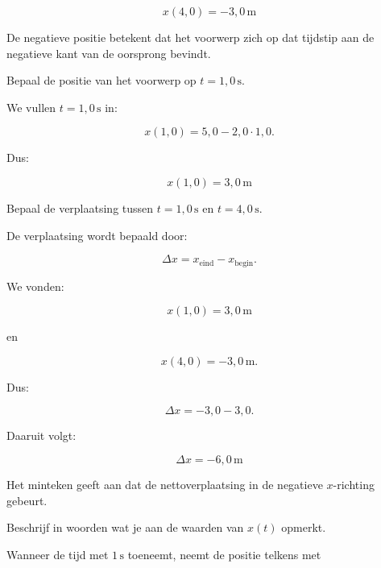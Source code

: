 \documentclass{ximera}
\begin{document}
\begin{oefening}{\oefB\ESS}
\begin{question}
\begin{oplossing}
  \[
  \boxed{x(4{,}0)=-3{,}0\,\mathrm{m}}
  \]
  
  De negatieve positie betekent dat het voorwerp zich op dat tijdstip aan de
  negatieve kant van de oorsprong bevindt.
  \end{oplossing}
  \end{question}
  
  
  \begin{question}
  Bepaal de positie van het voorwerp op $t=1{,}0\,\mathrm{s}$.
  
  \begin{oplossing}
  We vullen $t=1{,}0\,\mathrm{s}$ in:
  
  \[
  x(1{,}0)
  =
  5{,}0-2{,}0\cdot 1{,}0.
  \]
  
  Dus:
  
  \[
  \boxed{x(1{,}0)=3{,}0\,\mathrm{m}}
  \]
  \end{oplossing}
  \end{question}
  
  
  \begin{question}
  Bepaal de verplaatsing tussen $t=1{,}0\,\mathrm{s}$ en
  $t=4{,}0\,\mathrm{s}$.
  
  \begin{oplossing}
  De verplaatsing wordt bepaald door:
  
  \[
  \Delta x
  =
  x_{\text{eind}}
  -
  x_{\text{begin}}.
  \]
  
  We vonden:
  
  \[
  x(1{,}0)=3{,}0\,\mathrm{m}
  \]
  
  en
  
  \[
  x(4{,}0)=-3{,}0\,\mathrm{m}.
  \]
  
  Dus:
  
  \[
  \Delta x
  =
  -3{,}0-3{,}0.
  \]
  
  Daaruit volgt:
  
  \[
  \boxed{\Delta x=-6{,}0\,\mathrm{m}}
  \]
  
  Het minteken geeft aan dat de nettoverplaatsing in de negatieve
  $x$-richting gebeurt.
  \end{oplossing}
  \end{question}
  
  
  \begin{question}
  Beschrijf in woorden wat je aan de waarden van $x(t)$ opmerkt.
  
  \begin{oplossing}
  Wanneer de tijd met $1\,\mathrm{s}$ toeneemt, neemt de positie telkens met
  

\end{oplossing}
\end{question}
\end{oefening}
\end{document}
